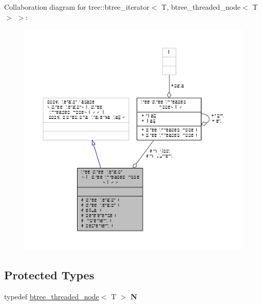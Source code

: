 Collaboration diagram for tree\-:\-:btree\-\_\-iterator$<$ T, btree\-\_\-threaded\-\_\-node$<$ T $>$ $>$\-:
\nopagebreak
\begin{figure}[H]
\begin{center}
\leavevmode
\includegraphics[width=350pt]{classtree_1_1btree__iterator_3_01T_00_01btree__threaded__node_3_01T_01_4_01_4__coll__graph}
\end{center}
\end{figure}
\subsection*{Protected Types}
\begin{DoxyCompactItemize}
\item 
\hypertarget{classtree_1_1btree__iterator_3_01T_00_01btree__threaded__node_3_01T_01_4_01_4_a4648c4864eba8e9052872c7d992a1114}{typedef \hyperlink{structtree_1_1btree__threaded__node}{btree\-\_\-threaded\-\_\-node}$<$ T $>$ {\bfseries N}}\label{classtree_1_1btree__iterator_3_01T_00_01btree__threaded__node_3_01T_01_4_01_4_a4648c4864eba8e9052872c7d992a1114}

\end{DoxyCompactItemize}
